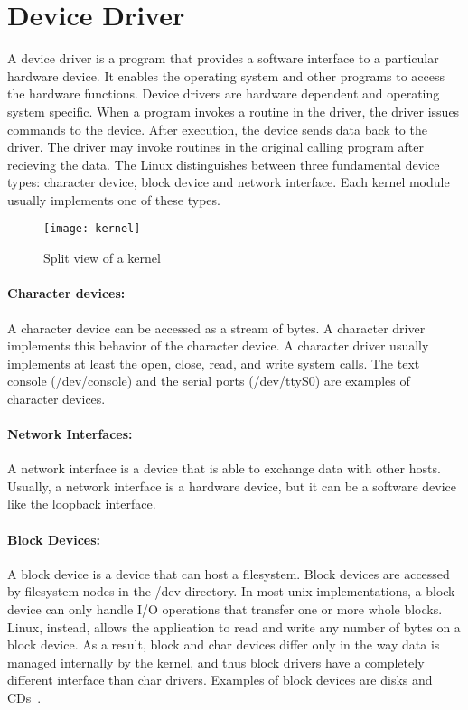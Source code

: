 \section{Device Driver}
\label{sec:device driver}
A device driver is a program that provides a software interface to a particular hardware device. It enables the operating system and other programs to access the hardware functions. Device drivers are hardware dependent and operating system specific. When a program invokes a routine in the driver, the driver issues commands to the device. After execution, the device sends data back to the driver. The driver may invoke routines in the original calling program after recieving the data. The Linux distinguishes between three fundamental device types: character device, block device and network interface. Each kernel module usually implements one of these types.
\begin{figure}[!ht]
\centering
\texttt{[image: kernel]}
\caption{Split view of a kernel}
\label{fig:kernel}
\end{figure}
\paragraph{Character devices:} A character device can be accessed as a stream of bytes. A character driver implements this behavior of the character device. A character driver usually implements at least the open, close, read, and write system calls. The text console (/dev/console) and the serial ports (/dev/ttyS0) are examples of character devices.

\paragraph{Network Interfaces:} A network interface is a device that is able to exchange data with other hosts. Usually, a network interface is a hardware device, but it can be a software device like the loopback interface. 

\paragraph{Block Devices:} A block device is a device that can host a filesystem. Block devices are accessed by filesystem nodes in the /dev directory. In most unix implementations, a block device can only handle I/O operations that transfer one or more whole blocks. Linux, instead, allows the application to read and write any number of bytes on a block device. As a result, block and char devices differ only in the way data is managed internally by the kernel, and thus block drivers have a completely different interface than char drivers. Examples of block devices are disks and CDs~\cite{Corbet:2005:LDD:1209083}.

